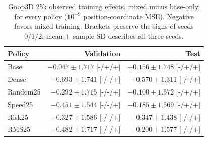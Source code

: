 \begin{table}[!ht]
\centering\small
\setlength{\tabcolsep}{5pt}\renewcommand{\arraystretch}{1.12}
\caption{Goop3D 25k observed training effects, mixed minus base-only, for every policy ($10^{-9}$ position-coordinate MSE). Negative favors mixed training. Brackets preserve the signs of seeds 0/1/2; mean $\pm$ sample SD describes all three seeds.}
\label{tab:goop3d25k-observed-position-training}
\begin{tabular}{lrr}
\toprule
Policy & Validation & Test\\
\midrule
Base & $-0.047\pm1.717$ [-/+/+] & $+0.156\pm1.748$ [-/+/+]\\
Dense & $-0.693\pm1.741$ [-/-/+] & $-0.570\pm1.311$ [-/-/+]\\
Random25 & $-0.292\pm1.715$ [-/-/+] & $-0.100\pm1.572$ [-/+/+]\\
Speed25 & $-0.451\pm1.544$ [-/-/+] & $-0.185\pm1.569$ [-/+/+]\\
Risk25 & $-0.327\pm1.586$ [-/-/+] & $-0.347\pm1.438$ [-/-/+]\\
RMS25 & $-0.482\pm1.717$ [-/-/+] & $-0.200\pm1.577$ [-/-/+]\\
\bottomrule
\end{tabular}
\end{table}
